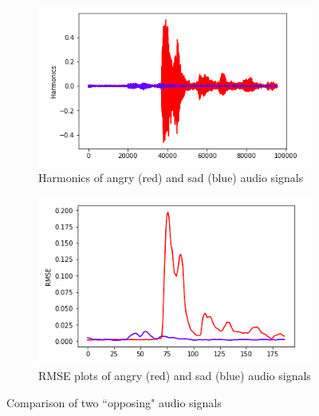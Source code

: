 \documentclass[11pt,a4paper]{article}
\begin{document}
\begin{figure}[h!]
	\centering
	\begin{subfigure}[b]{0.4\linewidth}
		\includegraphics[width=\linewidth]{pictures/harmonics.png}
		\caption{Harmonics of angry (red) and sad (blue) audio signals}
	\end{subfigure}
	\begin{subfigure}[b]{0.4\linewidth}
		\includegraphics[width=\linewidth]{pictures/rmse.png}
		\caption{RMSE plots of angry (red) and sad (blue) audio signals}
	\end{subfigure}
	\caption{Comparison of two ``opposing" audio signals}
	\label{fig:harm_rmse}
\end{figure}


\newpage



\end{document}
